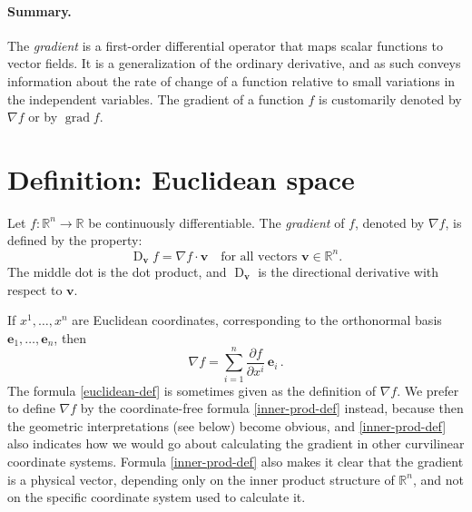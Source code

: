 \documentclass{article}
\newcommand{\real}{\mathbb{R}}
\providecommand{\defnterm}[1]{\emph{#1}}
\DeclareMathOperator{\D}{D}
\newcommand{\vv}{\mathbf{v}}
\newcommand{\ve}{\mathbf{e}}
\newcommand{\grad}{\operatorname{grad}}
\begin{document}
\paragraph{Summary.}

The \defnterm{gradient} is a first-order differential operator that maps
scalar functions to vector fields. It is a generalization of the ordinary
derivative, and as such conveys information about the rate of change
of a function relative to small variations in the independent
variables. The gradient of a function $f$ is customarily denoted by
$\nabla f$ or by $\grad f$.
\tableofcontents

\section{Definition: Euclidean space}

Let $f\colon \real^n \to \real$ be continuously differentiable.
The \defnterm{gradient} of $f$, denoted by $\nabla f$, 
is defined 
by the property:
\begin{equation}\label{inner-prod-def}
\D_\vv f = \nabla f \cdot \vv \quad \text{for all vectors $\vv \in \real^n$.}
\end{equation}
The middle dot is the dot product,
and $\D_\vv$ is the directional derivative with respect to $\vv$.

\smallskip

If $x^1, \dotsc, x^n$ are Euclidean coordinates,
corresponding to the orthonormal basis $\ve_1, \dotsc, \ve_n$,
then
\begin{equation}\label{euclidean-def}
\nabla f = \sum_{i=1}^n \frac{\partial f}{\partial x^i}\, \ve_i\,.
\end{equation}
The formula \eqref{euclidean-def} is sometimes given as the definition of $\nabla f$.
We prefer to define $\nabla f$ by the coordinate-free formula \eqref{inner-prod-def} instead,
because then the geometric interpretations (see below) become obvious,
and \eqref{inner-prod-def} also indicates how we would go about
calculating the gradient in other curvilinear coordinate systems.
Formula \eqref{inner-prod-def} also makes it clear that the gradient
is a physical vector, depending only on the inner product structure of $\real^n$,
and not on the specific coordinate system used to calculate it.
\end{document}
